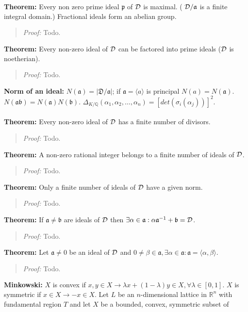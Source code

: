 \\
\\
{\bf Theorem:}
Every non zero prime ideal ${\mathfrak p}$ of ${\cal D}$ is maximal. (
${\cal D}/{\mathfrak a}$ is a finite integral domain.)  Fractional ideals form an abelian
group.  
\begin{quote}
\emph{Proof:} Todo.
\end{quote}
{\bf Theorem:}
Every non-zero ideal of
${\cal D}$ can be factored into prime ideals (${\cal D}$ is noetherian).
\begin{quote}
\emph{Proof:} Todo.
\end{quote}
{\bf Norm of an ideal:} 
$N({\mathfrak a})= |{\mathfrak D}/{\mathfrak a}|$; if ${\mathfrak a}= \langle a \rangle$ 
is principal
$N(a)= N({\mathfrak a})$. 
$N({\mathfrak a}{\mathfrak b})= N({\mathfrak a}) N({\mathfrak b})$.
$\Delta_{K/{\mathbb Q}}(\alpha_1 , \alpha_2, \ldots , \alpha_n )= 
[det(\sigma_i (\alpha_j))]^2$.
\\
\\
{\bf Theorem:}
Every non-zero ideal of ${\cal D}$ has a finite number
of divisors.  
\begin{quote}
\emph{Proof:} Todo.
\end{quote}
{\bf Theorem:}
A non-zero rational integer belongs to a finite number
of ideals of ${\cal D}$.  
\begin{quote}
\emph{Proof:} Todo.
\end{quote}
{\bf Theorem:}
Only a finite number of ideals of ${\cal D}$
have a given norm.  
\begin{quote}
\emph{Proof:} Todo.
\end{quote}
{\bf Theorem:}
If ${\mathfrak a} \ne {\mathfrak b}$ are ideals of ${\cal D}$ then
$\exists \alpha \in {\mathfrak a}: \alpha {\mathfrak a}^{-1} + {\mathfrak b}= {\cal D}$.
\begin{quote}
\emph{Proof:} Todo.
\end{quote}
{\bf Theorem:}
Let ${\mathfrak a} \ne 0$ be an ideal of ${\cal D}$ and $0 \ne \beta \in {\mathfrak a},
\exists \alpha \in {\mathfrak a}: {\mathfrak a}= \langle  \alpha, \beta \rangle$.
\begin{quote}
\emph{Proof:} Todo.
\end{quote}
{\bf Minkowski:}
$X$ is convex if $x, y \in X \rightarrow \lambda x + (1-\lambda)y \in X,
\forall \lambda \in [0,1]$.
$X$ is  symmetric if $x \in X \rightarrow -x \in X$.
Let $L$ be an $n$-dimensional lattice in ${\mathbb R}^n$ with
fundamental region $T$ and let $X$ be a bounded, convex, symmetric subset of
